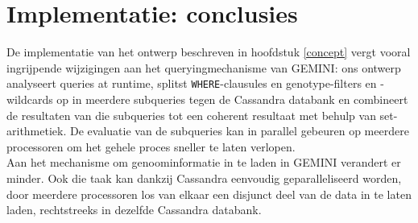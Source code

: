 \section{Implementatie: conclusies}

De implementatie van het ontwerp beschreven in hoofdstuk \ref{concept} vergt vooral ingrijpende wijzigingen aan het queryingmechanisme van GEMINI: ons ontwerp analyseert queries at runtime, splitst \texttt{WHERE}-clausules en genotype-filters en -wildcards op in meerdere subqueries tegen de Cassandra databank en combineert de resultaten van die subqueries tot een coherent resultaat met behulp van set-arithmetiek. De evaluatie van de subqueries kan in parallel gebeuren op meerdere processoren om het gehele proces sneller te laten verlopen.\\
Aan het mechanisme om genoominformatie in te laden in GEMINI verandert er minder. Ook die taak kan dankzij Cassandra eenvoudig geparalleliseerd worden, door meerdere processoren los van elkaar een disjunct deel van de data in te laten laden, rechtstreeks in dezelfde Cassandra databank.
